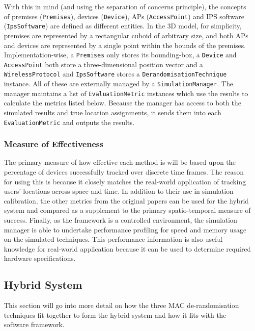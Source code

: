 With this in mind (and using the separation of concerns principle), the concepts of premises (\texttt{Premises}), devices (\texttt{Device}), APs (\texttt{AccessPoint}) and IPS software (\texttt{IpsSoftware}) are defined as different entities.
In the 3D model, for simplicity, premises are represented by a rectangular cuboid of arbitrary size, and both APs and devices are represented by a single point within the bounds of the premises.
Implementation-wise, a \texttt{Premises} only stores its bounding-box, a \texttt{Device} and \texttt{AccessPoint} both store a three-dimensional position vector and a \texttt{WirelessProtocol} and \texttt{IpsSoftware} stores a \texttt{DerandomisationTechnique} instance.
All of these are externally managed by a \texttt{SimulationManager}.
The manager maintains a list of \texttt{EvaluationMetric} instances which use the results to calculate the metrics listed below.
Because the manager has access to both the simulated results and true location assignments, it sends them into each \texttt{EvaluationMetric} and outputs the results.

\subsubsection{Measure of Effectiveness}

The primary measure of how effective each method is will be based upon the percentage of devices successfully tracked over discrete time frames.
The reason for using this is because it closely matches the real-world application of tracking users’ locations across space and time.
In addition to their use in simulation calibration, the other metrics from the original papers can be used for the hybrid system and compared as a supplement to the primary spatio-temporal measure of success.
Finally, as the framework is a controlled environment, the simulation manager is able to undertake performance profiling for speed and memory usage on the simulated techniques.
This performance information is also useful knowledge for real-world application because it can be used to determine required hardware specifications.

\subsection{Hybrid System}\label{sec:hybrid-system}

This section will go into more detail on how the three MAC de-randomisation techniques fit together to form the hybrid system and how it fits with the software framework.

